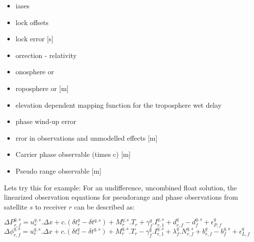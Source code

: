 \begin{itemize}
	\item {\LARGE{\boldmath{$\beta$}}}iases
	\item {\LARGE{\boldmath{$\zeta$}}}lock offsets
	\item {\LARGE{}}lock error [s]
	\item {\LARGE{\boldmath{$\kappa$}}}orrection - relativity
	\item {\LARGE{\boldmath{$\iota$}}}onosphere or  {\LARGE{}}
	\item {\LARGE{\boldmath{$\tau$}}}roposphere or {\LARGE{}} [m]
	\item {\LARGE{}} elevation dependent mapping function for the troposphere wet delay
	\item {\LARGE{\boldmath{$\xi$}}} phase wind-up error
	\item {\LARGE{\boldmath{$\epsilon$}}}rror in observations and unmodelled effects [m]
	\item {\LARGE{}} Carrier phase observable (times c) [m]
	\item {\LARGE{}}Pseudo range observable [m]
		
\end{itemize}

Lets try this for example:
For an undifference, uncombined float solution, the linearized observation equations for pseudorange and phase observations from satellite $s$ to receiver $r$ can be described as:

\begin{math}
\Delta P_{r,f}^{q,s} = u_r^{q,s} . \Delta x + c . (\delta t_r^q - \delta t^{q,s}) + M_r^{q,s} . T_r + \gamma_f^q . I_{r,1}^{q,s} + d_{r,f}^q - d_f^{q,s} + \epsilon_{P,f}^q
\end{math}\\
\begin{math}
\Delta\phi_{r,f}^{q,s} = u_r^{q,s} . \Delta x + c . (\delta t_r^q - \delta t^{q,s}) + M_r^{q,s} . T_r - \gamma_f^q . I_{r,1}^{q,s} + \lambda_f^q . N_{r,f}^{q,s} + b_{r,f}^q - b_f^{q,s} + \epsilon_{L,f}^q 
\end{math}

